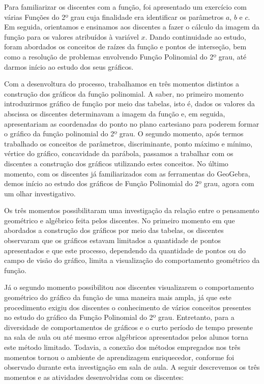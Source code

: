 \begin{refsection}
    Para familiarizar os discentes com a função, foi apresentado um exercício com várias Funções do 2º grau cuja finalidade era identificar os parâmetros $a$, $b$ e $c$. Em seguida, orientamos e ensinamos aos discentes a fazer o cálculo da imagem da função para os valores atribuídos à variável $x$. Dando continuidade ao estudo, foram abordados os conceitos de raízes da função e pontos de interseção, bem como a resolução de problemas envolvendo Função Polinomial do 2º grau, até darmos início ao estudo dos seus gráficos. 

    Com a desenvoltura do processo, trabalhamos en três momentos distintos a construção dos gráficos da função polinomial. A saber, no primeiro momento introduzirmos gráfico de função por meio das tabelas, isto é, dados os valores da abscissa os discentes determinavam a imagem da função e, em seguida, apresentariam as coordenadas do ponto no plano cartesiano para poderem formar o gráfico da função polinomial do 2º grau. O segundo momento, após termos trabalhado os conceitos de parâmetros, discriminante, ponto máximo e mínimo, vértice do gráfico, concavidade da parábola, passamos a trabalhar com os discentes a construção dos gráficos utilizando estes conceitos. No último momento, com os discentes já familiarizados com as ferramentas do GeoGebra, demos início ao estudo dos gráficos de Função Polinomial do 2º grau, agora com um olhar investigativo. 

    Os três momentos possibilitaram uma investigação da relação entre o pensamento geométrico e algébrico feita pelos discentes. No primeiro momento em que abordados a construção dos gráficos por meio das tabelas, os discentes observaram que os gráficos estavam limitados a quantidade de pontos apresentados e que este processo, dependendo da quantidade de pontos ou do campo de visão do gráfico, limita a visualização do comportamento geométrico da função.  

    Já o segundo momento possibilitou aos discentes visualizarem o comportamento geométrico do gráfico da função de uma maneira mais ampla, já que este procedimento exigiu dos discentes o conhecimento de vários conceitos presentes no estudo do gráfico da Função Polinomial do 2º grau. Entretanto, para a diversidade de comportamentos de gráficos e o curto período de tempo presente na sala de aula ou até mesmo erros algébricos apresentados pelos alunos torna este método limitado. Todavia, a conexão dos métodos empregados nos três momentos tornou o ambiente de aprendizagem enriquecedor, conforme foi observado durante esta investigação em sala de aula. A seguir descrevemos os três momentos e as atividades desenvolvidas com os discentes:
    

\end{refsection}
